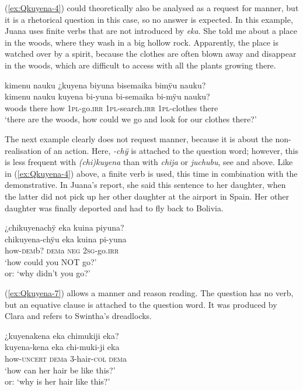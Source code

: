 (\ref{ex:Qkuyena-4}) could theoretically also be analysed as a request for manner, but it is a rhetorical question in this case, so no answer is expected. In this example, Juana uses finite verbs that are not introduced by \textit{eka}. She told me about a place in the woods, where they wash in a big hollow rock. Apparently, the place is watched over by a spirit, because the clothes are often blown away and disappear in the woods, which are difficult to access with all the plants growing there.

\ea\label{ex:Qkuyena-4}
\begingl
\glpreamble kimenu nauku ¿kuyena biyuna bisemaika bimÿu nauku?\\
\gla kimenu nauku kuyena bi-yuna bi-semaika bi-mÿu nauku?\\
\glb woods there how 1\textsc{pl}-go.\textsc{irr} 1\textsc{pl}-search.\textsc{irr} 1\textsc{pl}-clothes there\\
\glft ‘there are the woods, how could we go and look for our clothes there?’
\endgl
\trailingcitation{[jxx-p151020l-2]}
\xe

The next example clearly does not request manner, because it is about the non-realisation of an action. Here, \textit{-chÿ} is attached to the question word; however, this is less frequent with \textit{(chi)kuyena} than with \textit{chija} or \textit{juchubu}, see  and  above. Like in (\ref{ex:Qkuyena-4}) above, a finite verb is used, this time in combination with the demonstrative. In Juana’s report, she said this sentence to her daughter, when the latter did not pick up her other daughter at the airport in Spain. Her other daughter was finally deported and had to fly back to Bolivia.

\ea\label{ex:Qkuyena-5}
\begingl
\glpreamble ¿chikuyenachÿ eka kuina piyuna?\\
\gla chikuyena-chÿu eka kuina pi-yuna\\
\glb how-\textsc{dem}b? \textsc{dem}a \textsc{neg} 2\textsc{sg}-go.\textsc{irr}\\
\glft ‘how could you NOT go?’\\or: ‘why didn’t you go?’
\endgl
\trailingcitation{[jxx-p110923l-1.308]}
\xe

(\ref{ex:Qkuyena-7}) allows a manner and reason reading. The question has no verb, but an equative clause is attached to the question word. It was produced by Clara and refers to Swintha’s dreadlocks.

\ea\label{ex:Qkuyena-7}
\begingl
\glpreamble ¿kuyenakena eka chimukiji eka?\\
\gla kuyena-kena eka chi-muki-ji eka\\
\glb how-\textsc{uncert} \textsc{dem}a 3-hair-\textsc{col} \textsc{dem}a\\
\glft ‘how can her hair be like this?’\\or: ‘why is her hair like this?’
\endgl
\trailingcitation{[cux-c120414ls-2.345]}
\xe

